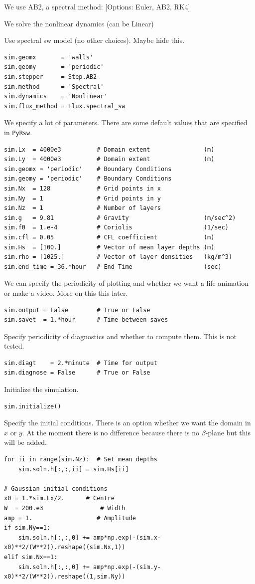 \documentclass[11pt]{article}
\begin{document}
\noindent We use AB2, a spectral method: [Options: Euler, AB2, RK4]

\noindent We solve the nonlinear dynamics (can be Linear) 

\noindent  Use spectral sw model (no other choices).  Maybe hide this.
\begin{lstlisting}
sim.geomx       = 'walls'            
sim.geomy       = 'periodic'
sim.stepper     = Step.AB2       
sim.method      = 'Spectral'       
sim.dynamics    = 'Nonlinear'    
sim.flux_method = Flux.spectral_sw
\end{lstlisting}

We specify a lot of parameters.  There are some default values that are specified in {\tt PyRsw}.
\begin{lstlisting}
sim.Lx  = 4000e3          # Domain extent               (m)
sim.Ly  = 4000e3          # Domain extent               (m)
sim.geomx = 'periodic'    # Boundary Conditions
sim.geomy = 'periodic'    # Boundary Conditions
sim.Nx  = 128             # Grid points in x
sim.Ny  = 1               # Grid points in y
sim.Nz  = 1               # Number of layers
sim.g   = 9.81            # Gravity                     (m/sec^2)
sim.f0  = 1.e-4           # Coriolis                    (1/sec)
sim.cfl = 0.05            # CFL coefficient             (m)
sim.Hs  = [100.]          # Vector of mean layer depths (m)
sim.rho = [1025.]         # Vector of layer densities   (kg/m^3)
sim.end_time = 36.*hour   # End Time                    (sec)
\end{lstlisting}

We can specify the periodicity of plotting and whether we want a life animation or make a video.  More on this this later.
\begin{lstlisting}
sim.output = False        # True or False
sim.savet  = 1.*hour      # Time between saves
\end{lstlisting}

Specify periodicity of diagnostics and whether to compute them.  This is not tested.
\begin{lstlisting}
sim.diagt    = 2.*minute  # Time for output
sim.diagnose = False      # True or False
\end{lstlisting}

Initialize the simulation.
\begin{lstlisting}
sim.initialize()
\end{lstlisting}

Specify the initial conditions.  There is an option whether we want the domain in $x$ or $y$.  At the moment there is no difference because there is no $\beta$-plane but this will be added.
\begin{lstlisting}
for ii in range(sim.Nz):  # Set mean depths
    sim.soln.h[:,:,ii] = sim.Hs[ii]

# Gaussian initial conditions
x0 = 1.*sim.Lx/2.      # Centre
W  = 200.e3                # Width
amp = 1.                  # Amplitude
if sim.Ny==1:
    sim.soln.h[:,:,0] += amp*np.exp(-(sim.x-x0)**2/(W**2)).reshape((sim.Nx,1))
elif sim.Nx==1:
    sim.soln.h[:,:,0] += amp*np.exp(-(sim.y-x0)**2/(W**2)).reshape((1,sim.Ny))
\end{lstlisting}
\end{document}
